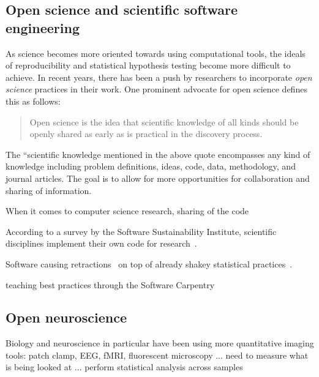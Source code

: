 \subsection{Open science and scientific software engineering}\label{subsec:open-science}

As science becomes more oriented towards using computational
tools, the ideals of reproducibility and statistical hypothesis
testing become more difficult to achieve. In recent years, there
has been a push by researchers to incorporate \emph{open science}
practices in their work. One prominent advocate for open science
defines this as follows:
\begin{quote}
	\begin{fancyquote}
	Open science is the idea that scientific knowledge of all kinds
	should be openly shared as early as is practical in the discovery
	process.
	\end{fancyquote}
\end{quote}

The ``scientific knowledge mentioned in the above quote
encompasses any kind of knowledge including problem definitions,
ideas, code, data, methodology, and journal articles. The goal is
to allow for more opportunities for collaboration and sharing of
information.

When it comes to computer science research, sharing of the code 

According to a survey by the Software Sustainability Institute,
scientific disciplines implement their own code for
research~\autocite{SSI:hettrick_2014_14809}.

Software causing retractions~\autocite{Miller2006,Merali2010,Joppa2013}
on top of already shakey statistical
practices~\autocite{Ioannidis2005,Button2013}.

teaching best practices through the Software Carpentry~\cite{Wilson2006,Wilson2014}


\subsection{Open neuroscience}
Biology and neuroscience in particular have been using more
quantitative imaging tools: patch clamp, EEG, fMRI, fluorescent
microscopy ... need to measure what is being looked at ... perform
statistical analysis across samples

